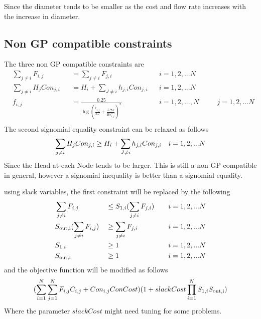 \documentclass[12pt]{article}
\begin{document}
	Since the diameter tends to be smaller as the cost and flow rate increases with the increase in diameter.
	
	\subsection{Non GP compatible constraints}
	The three non GP compatible constraints are 
	\begin{equation}
	\begin{aligned}
	& \sum_{j \neq i} F_{i,j} && = \sum_{j \neq i} F_{j,i} \quad && i = 1, 2, ... N\\
	& \sum_{j \neq i} H_j Con_{j,i} && = H_i + \sum_{J \neq i} h_{j,i}Con_{j,i} && i = 1,2, ...N\\
	& f_{i,j} &&= \frac{0.25}{\log\left(\frac{\bar{\epsilon}_{i,j}}{3.7} + \frac{5.74}{Re_{i,j}^{0.9}}\right)^2} && i = 1, 2, ..., N \quad && j = 1, 2, ... N\\
	\end{aligned}
	\end{equation}
	The second signomial equality constraint can be relaxed as follows
	\begin{equation}
	\sum_{j \neq i} H_j Con_{j,i} \geq H_i + \sum_{J \neq i} h_{j,i}Con_{j,i} \quad i = 1,2, ...N\\
	\end{equation}
	Since the Head at each Node tends to be larger. This is still a non GP compatible in general, however a signomial inequality is better than a signomial equality.
	
	using slack variables, the first constraint will be replaced by the following
	\begin{equation}
	\begin{aligned}
	& \sum_{j \neq i} F_{i,j} && \leq S_{1,i}(\sum_{j \neq i} F_{j,i}) \quad && i = 1, 2, ... N\\
	& S_{\rm{out},i}(\sum_{j \neq i} F_{i,j}) && \geq \sum_{j \neq i} F_{j,i} \quad && i = 1, 2, ... N\\
	& S_{1,i} && \geq 1 \quad && i = 1, 2, ... N\\
	& S_{\rm{out},i} && \geq 1 \quad && i = 1, 2, ... N\\
	\end{aligned}
	\end{equation}
	and the objective function will be modified as follows
	\begin{equation}
	(\sum_{i=1}^{N}\sum_{j=1}^{N} F_{i,j} C_{i,j} + Con_{i,j} ConCost)(1 + slackCost \prod_{i=1}^{N}S_{1,i}S_{\rm{out},i})
	\end{equation}
	Where the parameter $slackCost$ might need tuning for some problems.
	
\end{document}
